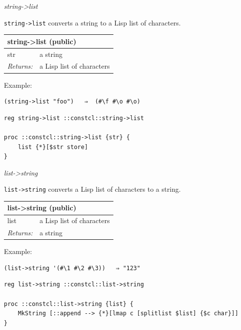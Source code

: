 \documentclass[twoside,9pt]{report}
\begin{document}
\emph{string->list}


\texttt{string->list} converts a string to a Lisp list of characters.

\begin{tabular}{ |l l| }
\hline
\multicolumn{2}{|l|}{string->list (public)} \\
\hline
str & a string \\
\textit{Returns:} & a Lisp list of characters \\
\hline
\end{tabular}


Example:

\noindent\makebox[\linewidth]{\rule{\linewidth}{0.4pt}}
\begin{lstlisting}
(string->list "foo")   ⇒  (#\f #\o #\o)
\end{lstlisting}
\noindent\makebox[\linewidth]{\rule{\linewidth}{0.4pt}}
\noindent\makebox[\linewidth]{\rule{\linewidth}{0.4pt}}
\begin{lstlisting}
reg string->list ::constcl::string->list
 
proc ::constcl::string->list {str} {
    list {*}[$str store]
}
\end{lstlisting}
\noindent\makebox[\linewidth]{\rule{\linewidth}{0.4pt}}

\emph{list->string}


\texttt{list->string} converts a Lisp list of characters to a string.

\begin{tabular}{ |l l| }
\hline
\multicolumn{2}{|l|}{list->string (public)} \\
\hline
list & a Lisp list of characters \\
\textit{Returns:} & a string \\
\hline
\end{tabular}


Example:

\noindent\makebox[\linewidth]{\rule{\linewidth}{0.4pt}}
\begin{lstlisting}
(list->string '(#\1 #\2 #\3))   ⇒ "123"
\end{lstlisting}
\noindent\makebox[\linewidth]{\rule{\linewidth}{0.4pt}}
\noindent\makebox[\linewidth]{\rule{\linewidth}{0.4pt}}
\begin{lstlisting}
reg list->string ::constcl::list->string
 
proc ::constcl::list->string {list} {
    MkString [::append --> {*}[lmap c [splitlist $list] {$c char}]]
}
\end{lstlisting}
\noindent\makebox[\linewidth]{\rule{\linewidth}{0.4pt}}
\end{document}
